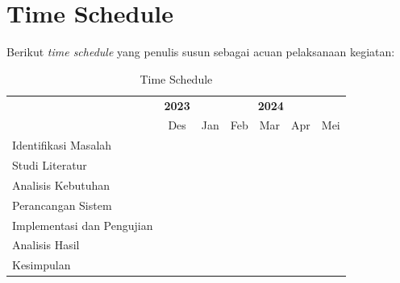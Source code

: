 \documentclass[10pt,]{report}
\begin{document}
\section{Time Schedule}
\begin{adjustwidth}{7mm}{}
	Berikut \textit{time schedule} yang penulis susun sebagai acuan pelaksanaan
	kegiatan:
	\begin{table}[H]
		\caption{Time Schedule}
		\begin{tabular}{|p{2cm}|c|c|c|c|c|c|}
			\hline
      \multicolumn{1}{|c|}{\multirow{2}{*}{\centering{\textbf{Kegiatan}}}} & \textbf{2023}     & \multicolumn{5}{|c|}{\textbf{2024}}                                                                                 \\
			\cline{2-7}
			                                               & Des               & Jan                                 & Feb               & Mar               & Apr               & Mei               \\
			\hline
			Identifikasi Masalah                           & \cellcolor{green} &                                     &                   &                   &                   &                   \\
			\hline
			Studi Literatur                                &                   & \cellcolor{green}                   &                   &                   &                   &                   \\
			\hline
			Analisis Kebutuhan                             &                   & \cellcolor{green}                   &                   &                   &                   &                   \\
			\hline
			Perancangan Sistem                             &                   &                                     & \cellcolor{green} & \cellcolor{green} &                   &                   \\
			\hline
			Implementasi dan Pengujian                     &                   &                                     &                   &                   & \cellcolor{green} &                   \\
			\hline
			Analisis Hasil                                 &                   &                                     &                   &                   &                   & \cellcolor{green} \\
			\hline
			Kesimpulan                                     &                   &                                     &                   &                   &                   & \cellcolor{green} \\
			\hline
		\end{tabular}
	\end{table}

\end{adjustwidth}
\end{document}
